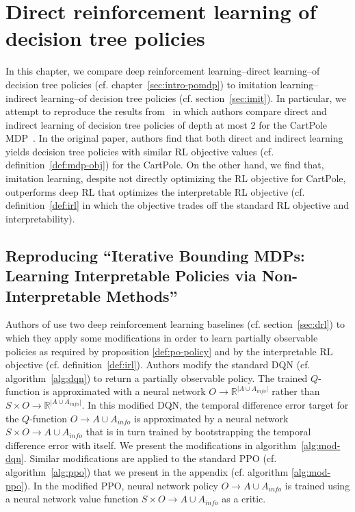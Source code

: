 \chapter{Direct reinforcement learning of decision tree policies}\label{sec:topin}
In this chapter, we compare deep reinforcement learning--direct learning--of decision tree policies (cf. chapter~\ref{sec:intro-pomdp}) to imitation learning--indirect learning--of decision tree policies (cf. section~\ref{sec:imit}).
In particular, we attempt to reproduce the results from~\cite[table 1]{topin2021iterative} in which authors compare direct and indirect learning of decision tree policies of depth at most 2 for the CartPole MDP~\cite{cartpole}.
In the original paper, authors find that both direct and indirect learning yields decision tree policies with similar RL objective values (cf. definition~\ref{def:mdp-obj}) for the CartPole.
On the other hand, we find that, imitation learning, despite not directly optimizing the RL objective for CartPole, outperforms deep RL that optimizes the interpretable RL objective (cf. definition~\ref{def:irl} in which the objective trades off the standard RL objective and interpretability).

\section{Reproducing ``Iterative Bounding MDPs: Learning Interpretable Policies via Non-Interpretable Methods''}

Authors of \cite{topin2021iterative} use two deep reinforcement learning baselines (cf. section~\ref{sec:drl}) to which they apply some modifications in order to learn partially observable policies as required by proposition \ref{def:po-policy} and by the interpretable RL objective (cf. definition~\ref{def:irl}).
Authors modify the standard DQN (cf. algorithm~\ref{alg:dqn}) to return a partially observable policy. The trained $Q$-function is approximated with a neural network $O\rightarrow \mathbb{R}^{|A\cup A_{info}|}$ rather than $S\times O\rightarrow \mathbb{R}^{|A\cup A_{info}|}$.
In this modified DQN, the temporal difference error target for the $Q$-function $O\rightarrow A\cup A_{info}$ is approximated by a neural network $S\times O\rightarrow A\cup A_{info}$ that is in turn trained by bootstrapping the temporal difference error with itself.
We present the modifications in algorithm~\ref{alg:mod-dqn}.
Similar modifications are applied to the standard PPO (cf. algorithm~\ref{alg:ppo}) that we present in the appendix (cf. algorithm \ref{alg:mod-ppo}). In the modified PPO, neural network policy $O\rightarrow A\cup A_{info}$ is trained using a neural network value function $S\times O\rightarrow A\cup A_{info}$ as a critic.

